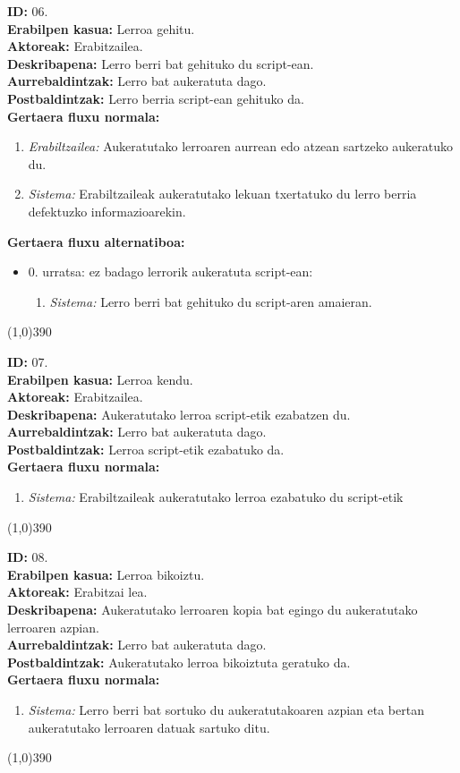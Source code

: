 \noindent
\textbf{ID:} 06.\\
\textbf{Erabilpen kasua:} Lerroa gehitu.\\
\textbf{Aktoreak:} Erabitzailea.\\
\textbf{Deskribapena:} Lerro berri bat gehituko du script-ean.\\
\textbf{Aurrebaldintzak:} Lerro bat aukeratuta dago.\\
\textbf{Postbaldintzak:} Lerro berria script-ean gehituko da.\\
\textbf{Gertaera fluxu normala:}
\begin{enumerate}
	\item \textit{Erabiltzailea:} Aukeratutako lerroaren aurrean edo atzean sartzeko aukeratuko du.
	\item \textit{Sistema:} Erabiltzaileak aukeratutako lekuan txertatuko du lerro berria defektuzko informazioarekin.
\end{enumerate}
\textbf{Gertaera fluxu alternatiboa:}
\begin{itemize}
	\item 0. urratsa: ez badago lerrorik aukeratuta script-ean:
		\begin{enumerate}
		\item \textit{Sistema:} Lerro berri bat gehituko du script-aren amaieran.
		\end{enumerate}
\end{itemize}
\line(1,0){390}

\noindent
\textbf{ID:} 07.\\
\textbf{Erabilpen kasua:} Lerroa kendu.\\
\textbf{Aktoreak:} Erabitzailea.\\
\textbf{Deskribapena:} Aukeratutako lerroa script-etik ezabatzen du.\\
\textbf{Aurrebaldintzak:} Lerro bat aukeratuta dago.\\
\textbf{Postbaldintzak:} Lerroa script-etik ezabatuko da.\\
\textbf{Gertaera fluxu normala:}
\begin{enumerate}
	\item \textit{Sistema:} Erabiltzaileak aukeratutako lerroa ezabatuko du script-etik
\end{enumerate}
\line(1,0){390}

\noindent
\textbf{ID:} 08.\\
\textbf{Erabilpen kasua:} Lerroa bikoiztu.\\
\textbf{Aktoreak:} Erabitzai
lea.\\
\textbf{Deskribapena:} Aukeratutako lerroaren kopia bat egingo du aukeratutako lerroaren azpian.\\
\textbf{Aurrebaldintzak:} Lerro bat aukeratuta dago.\\
\textbf{Postbaldintzak:} Aukeratutako lerroa bikoiztuta geratuko da.\\
\textbf{Gertaera fluxu normala:}
\begin{enumerate}
	\item \textit{Sistema:} Lerro berri bat sortuko du aukeratutakoaren azpian eta bertan aukeratutako lerroaren datuak sartuko ditu.
\end{enumerate}
\line(1,0){390}

